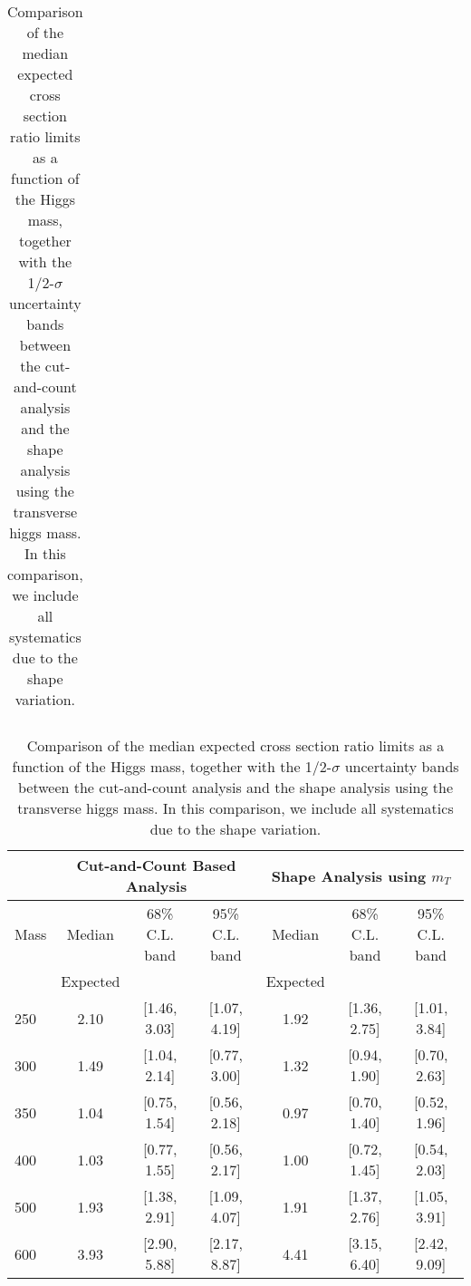 \begin{table}[!ht]
\begin{center}
{\begin{tabular}{|l|c|c|c|c|c|c|}
\hline
\end{tabular}
}
\caption{Comparison of the median expected cross section ratio limits together with the 1/2-$\sigma$ uncertainty bands of 
the shape analysis with and without accounting for the systematics due to the shape variation. 
The results are presented as a function of the Higgs mass. }
\label{tab:mva_mtshapewithwithout_hzz}
\end{center}
\begin{center}
{\normalsize
\begin{tabular}{|l|c|c|c|c|c|c|}
\hline
      &  \multicolumn{3}{c|}{Cut-and-Count Based Analysis} &\multicolumn{3}{c|}{Shape Analysis using $m_T$} \\
\hline
Mass  &  Median      &     68\% C.L. band &  95\% C.L. band &  Median	   &	 68\% C.L. band &  95\% C.L. band\\
      &  Expected    &                    &                 &  Expected    &			&		 \\
\hline
250 & 2.10 & [1.46, 3.03] & [1.07, 4.19] & 1.92 & [1.36, 2.75] & [1.01, 3.84] \\
300 & 1.49 & [1.04, 2.14] & [0.77, 3.00] & 1.32 & [0.94, 1.90] & [0.70, 2.63] \\
350 & 1.04 & [0.75, 1.54] & [0.56, 2.18] & 0.97 & [0.70, 1.40] & [0.52, 1.96] \\
400 & 1.03 & [0.77, 1.55] & [0.56, 2.17] & 1.00 & [0.72, 1.45] & [0.54, 2.03] \\
500 & 1.93 & [1.38, 2.91] & [1.09, 4.07] & 1.91 & [1.37, 2.76] & [1.05, 3.91] \\
600 & 3.93 & [2.90, 5.88] & [2.17, 8.87] & 4.41 & [3.15, 6.40] & [2.42, 9.09] \\

\hline
\end{tabular}
}
\caption{Comparison of the median expected cross section ratio limits as a function 
of the Higgs mass, together with the 1/2-$\sigma$ uncertainty bands between the cut-and-count 
analysis and the shape analysis using the transverse higgs mass. In this comparison, we include all systematics due to 
the shape variation. }
\label{tab:mva_mtshapevscuts_withshapevar_hzz}
\end{center}
\end{table}
